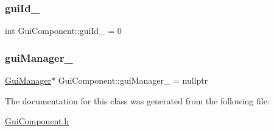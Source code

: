 \subsubsection{\texorpdfstring{guiId\_}{guiId\_}}
{\footnotesize\ttfamily int Gui\+Component\+::gui\+Id\+\_\+ = 0\hspace{0.3cm}{\ttfamily [protected]}}

\mbox{\label{class_gui_component_a96d148edf9f521cd048b98f749bdf2e5}} 
\subsubsection{\texorpdfstring{guiManager\_}{guiManager\_}}
{\footnotesize\ttfamily \mbox{\hyperlink{class_gui_manager}{Gui\+Manager}}$\ast$ Gui\+Component\+::gui\+Manager\+\_\+ = nullptr\hspace{0.3cm}{\ttfamily [protected]}}



The documentation for this class was generated from the following file\+:\begin{DoxyCompactItemize}
\item 
\mbox{\hyperlink{_gui_component_8h}{Gui\+Component.\+h}}\end{DoxyCompactItemize}
